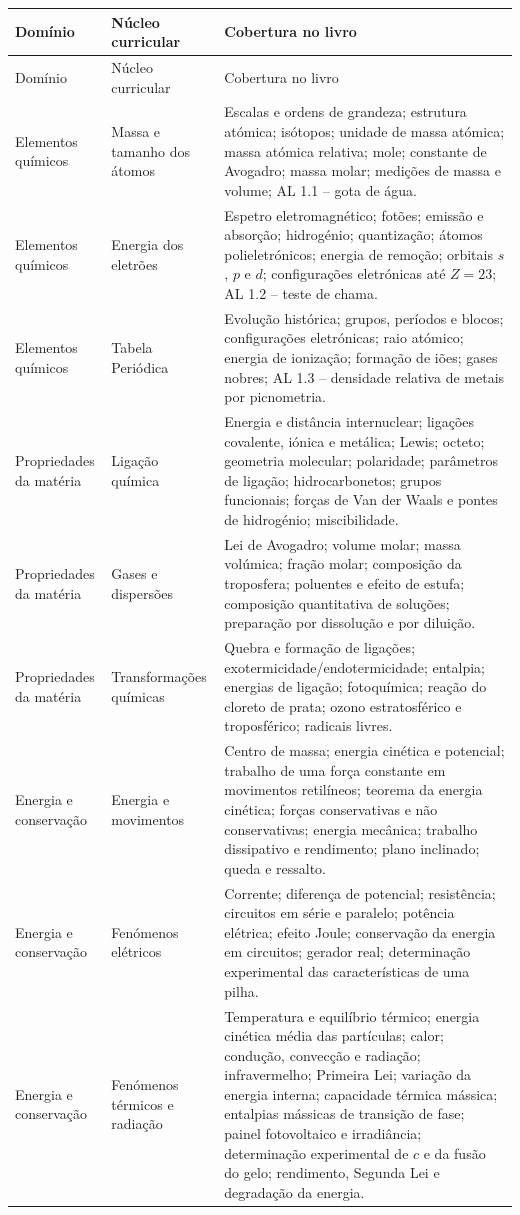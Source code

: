 \documentclass[11pt,a4paper,oneside]{book}
\begin{document}
\small
\begin{longtable}{p{}p{}p{}}
\toprule
Domínio & Núcleo curricular & Cobertura no livro \\
\midrule
\endfirsthead
\toprule
Domínio & Núcleo curricular & Cobertura no livro \\
\midrule
\endhead
Elementos químicos & Massa e tamanho dos átomos & Escalas e ordens de grandeza; estrutura atómica; isótopos; unidade de massa atómica; massa atómica relativa; mole; constante de Avogadro; massa molar; medições de massa e volume; AL 1.1 -- gota de água. \\
Elementos químicos & Energia dos eletrões & Espetro eletromagnético; fotões; emissão e absorção; hidrogénio; quantização; átomos polieletrónicos; energia de remoção; orbitais $s$, $p$ e $d$; configurações eletrónicas até $Z=23$; AL 1.2 -- teste de chama. \\
Elementos químicos & Tabela Periódica & Evolução histórica; grupos, períodos e blocos; configurações eletrónicas; raio atómico; energia de ionização; formação de iões; gases nobres; AL 1.3 -- densidade relativa de metais por picnometria. \\
Propriedades da matéria & Ligação química & Energia e distância internuclear; ligações covalente, iónica e metálica; Lewis; octeto; geometria molecular; polaridade; parâmetros de ligação; hidrocarbonetos; grupos funcionais; forças de Van der Waals e pontes de hidrogénio; miscibilidade. \\
Propriedades da matéria & Gases e dispersões & Lei de Avogadro; volume molar; massa volúmica; fração molar; composição da troposfera; poluentes e efeito de estufa; composição quantitativa de soluções; preparação por dissolução e por diluição. \\
Propriedades da matéria & Transformações químicas & Quebra e formação de ligações; exotermicidade/endotermicidade; entalpia; energias de ligação; fotoquímica; reação do cloreto de prata; ozono estratosférico e troposférico; radicais livres. \\
Energia e conservação & Energia e movimentos & Centro de massa; energia cinética e potencial; trabalho de uma força constante em movimentos retilíneos; teorema da energia cinética; forças conservativas e não conservativas; energia mecânica; trabalho dissipativo e rendimento; plano inclinado; queda e ressalto. \\
Energia e conservação & Fenómenos elétricos & Corrente; diferença de potencial; resistência; circuitos em série e paralelo; potência elétrica; efeito Joule; conservação da energia em circuitos; gerador real; determinação experimental das características de uma pilha. \\
Energia e conservação & Fenómenos térmicos e radiação & Temperatura e equilíbrio térmico; energia cinética média das partículas; calor; condução, convecção e radiação; infravermelho; Primeira Lei; variação da energia interna; capacidade térmica mássica; entalpias mássicas de transição de fase; painel fotovoltaico e irradiância; determinação experimental de $c$ e da fusão do gelo; rendimento, Segunda Lei e degradação da energia. \\
\bottomrule
\end{longtable}
\normalsize
\end{document}
